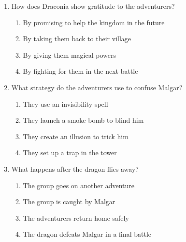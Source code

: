 \documentclass[12pt]{article}
\begin{document}
\begin{enumerate}
\vspace{0.5cm}

\item How does Draconia show gratitude to the adventurers?
\begin{enumerate}[label=\Alph*.]
    \item By promising to help the kingdom in the future
    \item By taking them back to their village
    \item By giving them magical powers
    \item By fighting for them in the next battle
\end{enumerate}

\vspace{0.5cm}

\item What strategy do the adventurers use to confuse Malgar?
\begin{enumerate}[label=\Alph*.]
    \item They use an invisibility spell
    \item They launch a smoke bomb to blind him
    \item They create an illusion to trick him
    \item They set up a trap in the tower
\end{enumerate}

\vspace{0.5cm}

\item What happens after the dragon flies away?
\begin{enumerate}[label=\Alph*.]
    \item The group goes on another adventure
    \item The group is caught by Malgar
    \item The adventurers return home safely
    \item The dragon defeats Malgar in a final battle
\end{enumerate}

\end{enumerate}
\end{document}
